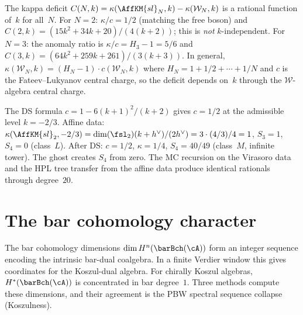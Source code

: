 \begin{remark}
\label{rem:comp-kappa-deficit}
The kappa deficit
$C(N,k) = \kappa(\AffKM{sl}_N, k) - \kappa(\mathcal{W}_N, k)$
is a rational function of~$k$ for all~$N$.
For $N = 2$: $\kappa/c = 1/2$ (matching the free boson) and
$C(2,k) = (15k^2 + 34k + 20)/(4(k{+}2))$; this is
\emph{not} $k$-independent.
For $N = 3$: the anomaly ratio is $\kappa/c = H_3 - 1 = 5/6$
and $C(3,k) = (64k^2 + 259k + 261)/(3(k{+}3))$.
In general, $\kappa(\mathcal{W}_N, k) = (H_N - 1)\cdot c(\mathcal{W}_N, k)$
where $H_N = 1 + 1/2 + \cdots + 1/N$ and $c$ is the
Fateev--Lukyanov central charge, so the deficit depends
on~$k$ through the $\mathcal{W}$-algebra central charge.
\end{remark}

\begin{example}[DS for $\fsl_2 \to \mathrm{Vir}$ at the Ising level
$k = -2/3$]
\label{ex:comp-ds-sl2-k10}
The DS formula $c = 1 - 6(k+1)^{2}/(k+2)$ gives $c = 1/2$ at the
admissible level $k = -2/3$.
Affine data: $\kappa(\AffKM{sl}_2, -2/3)
= \dim(\fsl_2)(k + h^\vee)/(2h^\vee) = 3 \cdot (4/3)/4 = 1$,
$S_3 = 1$, $S_4 = 0$ (class~$L$). After DS: $c = 1/2$,
$\kappa = 1/4$, $S_4 = 40/49$ (class~$M$, infinite tower).
The ghost creates $S_4$ from zero. The MC recursion on the
Virasoro data and the HPL tree transfer from the affine data
produce identical rationals through degree~$20$.
\end{example}


\section{The bar cohomology character}
\label{sec:comp-bar-cohomology}

The bar cohomology dimensions $\dim H^n(\barBch(\cA))$ form
an integer sequence encoding the intrinsic bar-dual coalgebra. In a
finite Verdier window this gives coordinates for the Koszul-dual
algebra. For chirally
Koszul algebras, $H^*(\barBch(\cA))$ is concentrated in bar
degree~$1$. Three methods compute these dimensions, and
their agreement is the PBW spectral sequence collapse
(Koszulness).


